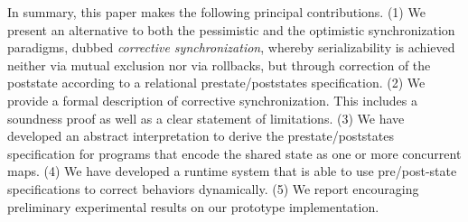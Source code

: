 In summary, this paper makes the following principal contributions.
  (1) We present an alternative to both the pessimistic and the optimistic synchronization paradigms, dubbed \emph{corrective synchronization}, whereby serializability is achieved neither via mutual exclusion nor via rollbacks, but through correction of the poststate according to a relational prestate/poststates specification.
(2) We provide a formal description of corrective synchronization. This includes a soundness proof as well as a clear statement of limitations.
	(3) We have developed an abstract interpretation to derive the prestate/poststates specification for programs that encode the shared state as one or more concurrent maps. 
(4) We have developed a runtime system that is able to use
pre/post-state specifications to correct behaviors dynamically.
%
(5) We report encouraging preliminary experimental results on
our prototype implementation.

